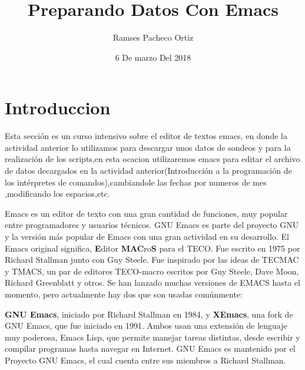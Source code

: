 \documentclass{article}
\begin{document}
\title{Preparando Datos Con Emacs}
\author{Ramses Pacheco Ortiz}
\date{6 De marzo Del 2018}
\maketitle  


\section{Introduccion}

Esta sección es un curso intensivo sobre el editor de textos emacs, en donde la actividad anterior lo utilizamos para descargar unos datos de sondeos y para la realización de los scripts,en esta ocacion utilizaremos emacs para editar el archivo de datos decargados en la actividad anterior(Introducción a la programación de los intérpretes de comandos),cambiandole las fechas por numeros de mes ,modificando los espacios,etc.


Emacs es un editor de texto con una gran cantidad de funciones, muy popular entre programadores y usuarios técnicos. GNU Emacs es parte del proyecto GNU y la versión más popular de Emacs con una gran actividad en su desarrollo.
El Emacs original significa, \textbf{E}ditor \textbf{MAC}ro\textbf{S }para el TECO. Fue escrito en 1975 por Richard Stallman junto con Guy Steele. Fue inspirado por las ideas de TECMAC y TMACS, un par de editores TECO-macro escritos por Guy Steele, Dave Moon, Richard Greenblatt y otros. Se han lanzado muchas versiones de EMACS hasta el momento, pero actualmente hay dos que son usadas comúnmente: 

\textbf{GNU Emacs}, iniciado por Richard Stallman en 1984, y \textbf{XEmacs}, una fork de GNU Emacs, que fue iniciado en 1991. Ambos usan una extensión de lenguaje muy poderosa, Emacs Lisp, que permite manejar tareas distintas, desde escribir y compilar programas hasta navegar en Internet. GNU Emacs es mantenido por el Proyecto GNU Emacs, el cual cuenta entre sus miembros a Richard Stallman.
\end{document}
